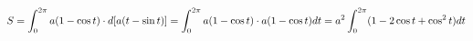 \documentclass[preview]{standalone}
\begin{document}
\begin{align*}
\special{dvisvgm:raw <g id='unique000'>}S = \int_{0}^{2\pi} a(1 - \cos t) \cdot d[a(t - \sin t)] = \int_{0}^{2\pi} a(1 - \cos t) \cdot a(1 - \cos t) dt = a^2 \int_{0}^{2\pi} (1 - 2\cos t + \cos^2 t) dt\special{dvisvgm:raw </g>}
\end{align*}
\end{document}
